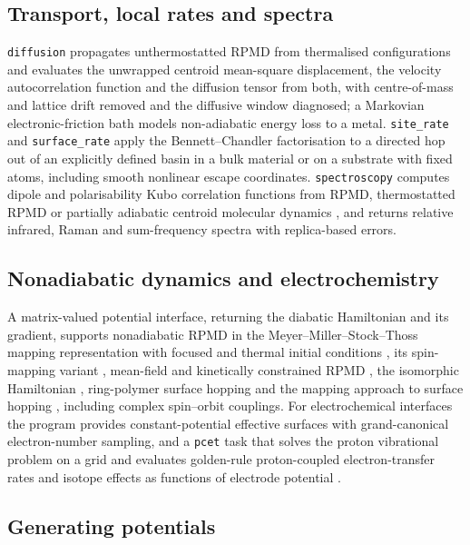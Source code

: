 \documentclass[preprint,12pt]{elsarticle}
\newcommand{\code}[1]{\texttt{#1}}
\begin{document}
\subsection{Transport, local rates and spectra}

\code{diffusion} propagates unthermostatted RPMD from thermalised configurations and evaluates the unwrapped centroid mean-square displacement, the velocity autocorrelation function and the diffusion tensor from both, with centre-of-mass and lattice drift removed and the diffusive window diagnosed; a Markovian electronic-friction bath \cite{efrpmd2024} models non-adiabatic energy loss to a metal. \code{site\_rate} and \code{surface\_rate} apply the Bennett--Chandler factorisation to a directed hop out of an explicitly defined basin in a bulk material or on a substrate with fixed atoms, including smooth nonlinear escape coordinates. \code{spectroscopy} computes dipole and polarisability Kubo correlation functions from RPMD, thermostatted RPMD \cite{trpmd14} or partially adiabatic centroid molecular dynamics \cite{cmd93,pacmd06}, and returns relative infrared, Raman and sum-frequency spectra with replica-based errors.

\subsection{Nonadiabatic dynamics and electrochemistry}

A matrix-valued potential interface, returning the diabatic Hamiltonian and its gradient, supports nonadiabatic RPMD in the Meyer--Miller--Stock--Thoss mapping representation with focused and thermal initial conditions \cite{na-nrpmd2013,na-focused2019}, its spin-mapping variant \cite{na-sm2021}, mean-field and kinetically constrained RPMD \cite{na-mv2013,na-kc2014}, the isomorphic Hamiltonian \cite{na-iso2018}, ring-polymer surface hopping \cite{na-rpsh2012,na-rpsh2017} and the mapping approach to surface hopping \cite{na-mash2023}, including complex spin--orbit couplings. For electrochemical interfaces the program provides constant-potential effective surfaces with grand-canonical electron-number sampling, and a \code{pcet} task that solves the proton vibrational problem on a grid and evaluates golden-rule proton-coupled electron-transfer rates and isotope effects as functions of electrode potential \cite{pcet2008}.

\subsection{Generating potentials}
\end{document}
